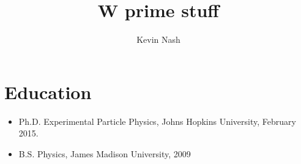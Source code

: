 \documentclass[12pt,oneside,final]{thesis}
\begin{document}
\title{W prime stuff}
\author{Kevin Nash}
\dissertation
\doctorphilosophy
\copyrightnotice




%








\section*{Education}

\begin{itemize}
  \item Ph.D. Experimental Particle Physics, Johns Hopkins University, February 2015.
  \item B.S. Physics, James Madison University, 2009
\end{itemize}

\end{document}
